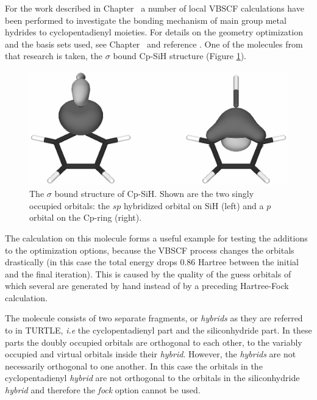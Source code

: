 For the work described in Chapter \chcyclopentadienyl\, a number of local VBSCF calculations have been performed to investigate the bonding mechanism of main group metal hydrides to cyclopentadienyl moieties. For details on the geometry optimization and the basis sets used, see Chapter \chcyclopentadienyl\ and reference \cite{budzelaar}. One of the molecules from that research is taken, the $\sigma$ bound \mbox{Cp-SiH} structure (Figure \ref{fig.cpsih}).
\begin{figure}[htdp]
\center
\includegraphics[scale=0.6]{orbopt/figures/sigma_sih.eps}
\caption{The $\sigma$ bound structure of Cp-SiH. Shown are the two singly occupied orbitals: the $sp$ hybridized orbital on SiH (left) and a $p$ orbital on the Cp-ring (right).}
\label{fig.cpsih}
\end{figure}
The calculation on this molecule forms a useful example for testing the additions to the optimization options, because the VBSCF process changes the orbitals drastically (in this case the total energy drops 0.86 Hartree between the initial and the final iteration). This is caused by the quality of the guess orbitals of which several are generated by hand instead of by a preceding Hartree-Fock calculation.

The molecule consists of two separate fragments, or \textit{hybrids} as they are referred to in TURTLE, \textit{i.e} the cyclopentadienyl part and the siliconhydride part. In these parts the doubly occupied orbitals are orthogonal to each other, to the variably occupied and virtual orbitals inside their \textit{hybrid}. However, the \textit{hybrids} are not necessarily orthogonal to one another. In this case the orbitals in the cyclopentadienyl \textit{hybrid} are not orthogonal to the orbitals in the siliconhydride \textit{hybrid} and therefore the \textit{fock} option cannot be used.

